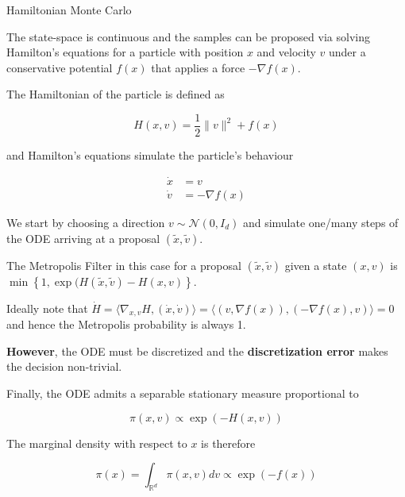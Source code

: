 \documentclass{beamer}
\begin{document}
\begin{frame}[allowframebreaks]{Hamiltonian Monte Carlo}
    
    The state-space is continuous and the samples can be proposed via solving Hamilton's equations for a particle with position $x$ and velocity $v$ under a conservative potential $f(x)$ that applies a force $-\nabla f(x)$. 
    
    The Hamiltonian of the particle is defined as 
    
    \begin{equation*}
        H(x, v) = \frac 1 2 \| v \|^2 + f(x)
    \end{equation*}
    
    and Hamilton's equations simulate the particle's behaviour
    
    \begin{align*}
        \dot x & = v \\
        \dot v & = - \nabla f(x)
    \end{align*}
    
    \framebreak
    
    We start by choosing a direction $v \sim \mathcal N(0, I_d)$ and simulate one/many steps of the ODE arriving at a proposal $(\tilde x, \tilde v)$. 
    
    \medskip
    
    The Metropolis Filter in this case for a proposal $(\tilde x, \tilde v)$ given a state $(x, v)$ is $\min \left \{ 1, \exp( H(\tilde x, \tilde v) - H(x, v) \right \}$.
    
    \medskip
    
    Ideally note that $\dot H = \langle \nabla_{x, v} H, (\dot x, \dot v) \rangle = \langle (v, \nabla f(x)), (- \nabla f(x), v) \rangle = 0$ and hence the Metropolis probability is always 1. 
    
    \medskip
    
    \textbf{However}, the ODE must be discretized and the \textbf{discretization error} makes the decision non-trivial. 
    
    \framebreak
    
    Finally, the ODE admits a separable stationary measure proportional to
    
    $$\pi(x, v) \propto \exp(-H(x,v))$$
    
    The marginal density with respect to $x$ is therefore
    
    $$\pi(x) = \int_{\mathbb R^d} \pi(x, v) d v \propto \exp(-f(x))$$
    
\end{frame}
    
\end{document}

